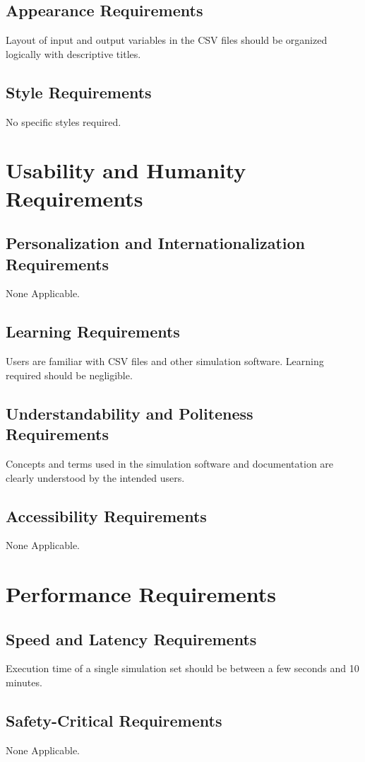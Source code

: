 \documentclass[paper=letter, fontsize=10pt]{scrartcl}
\numberwithin{equation}{section}		%
\numberwithin{figure}{section}			%
\numberwithin{table}{section}				%
\begin{document}
\subsection{Appearance Requirements}
Layout of input and output variables in the CSV files should be organized logically with descriptive titles. 
\subsection{Style Requirements}
No specific styles required.

\section{Usability and Humanity Requirements}
\subsection{Personalization and Internationalization Requirements}
None Applicable.
\subsection{Learning Requirements}
Users are familiar with CSV files and other simulation software. Learning required should be negligible.
\subsection{Understandability and Politeness Requirements}
Concepts and terms used in the simulation software and documentation are clearly understood by the intended users.
\subsection{Accessibility Requirements}
None Applicable.

\section{Performance Requirements}
\subsection{Speed and Latency Requirements}
Execution time of a single simulation set should be between a few seconds and 10 minutes.
\subsection{Safety-Critical Requirements}
None Applicable.
\end{document}
